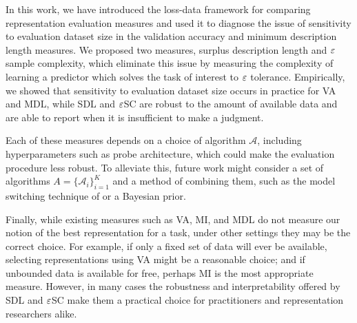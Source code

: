 In this work, we have introduced the loss-data framework for comparing representation evaluation measures and used it to diagnose the issue of sensitivity to evaluation dataset size in the validation accuracy and minimum description length measures.
We proposed two measures, surplus description length and $\varepsilon$ sample complexity, which eliminate this issue by measuring the complexity of learning a predictor which solves the task of interest to $\varepsilon$ tolerance.
Empirically, we showed that sensitivity to evaluation dataset size occurs in practice for VA and MDL, while SDL and $\varepsilon$SC are robust to the amount of available data and are able to report when it is insufficient to make a judgment.

Each of these measures depends on a choice of algorithm $\mathcal{A}$, including hyperparameters such as probe architecture, which could make the evaluation procedure less robust.
To alleviate this, future work might consider a set of algorithms $A = \{\mathcal{A}_i\}_{i=1}^K$ and a method of combining them, such as the model switching technique of \citet{Blier2018TheDL,Erven2012CatchingUF} or a Bayesian prior.

Finally, while existing measures such as VA, MI, and MDL do not measure our notion of the best representation for a task, under other settings they may be the correct choice.
For example, if only a fixed set of data will ever be available, selecting representations using VA might be a reasonable choice; and if unbounded data is available for free, perhaps MI is the most appropriate measure.
However, in many cases the robustness and interpretability offered by SDL and $\varepsilon$SC make them a practical choice for practitioners and representation researchers alike.


\printendnotes